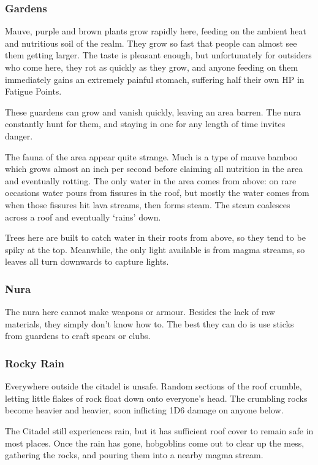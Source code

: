 \subsubsection{Gardens}
Mauve, purple and brown plants grow rapidly here, feeding on the ambient heat and nutritious soil of the realm.  They grow so fast that people can almost see them getting larger.  The taste is pleasant enough, but unfortunately for outsiders who come here, they rot as quickly as they grow, and anyone feeding on them immediately gains an extremely painful stomach, suffering half their own HP in Fatigue Points.

These guardens can grow and vanish quickly, leaving an area barren.  The nura constantly hunt for them, and staying in one for any length of time invites danger.

The fauna of the area appear quite strange. Much is a type of mauve bamboo which grows almost an inch per second before claiming all nutrition in the area and eventually rotting.  The only water in the area comes from above: on rare occasions water pours from fissures in the roof, but mostly the water comes from when those fissures hit lava streams, then forms steam.  The steam coalesces across a roof and eventually `rains' down.

Trees here are built to catch water in their roots from above, so they tend to be spiky at the top.  Meanwhile, the only light available is from magma streams, so leaves all turn downwards to capture lights.

\subsubsection{Nura}
The nura here cannot make weapons or armour.  Besides the lack of raw materials, they simply don't know how to.  The best they can do is use sticks from guardens to craft spears or clubs.

\subsubsection{Rocky Rain}
Everywhere outside the citadel is unsafe.  Random sections of the roof crumble, letting little flakes of rock float down onto everyone's head.  The crumbling rocks become heavier and heavier, soon inflicting 1D6 damage on anyone below.

The Citadel still experiences rain, but it has sufficient roof cover to remain safe in most places.  Once the rain has gone, hobgoblins come out to clear up the mess, gathering the rocks, and pouring them into a nearby magma stream.

